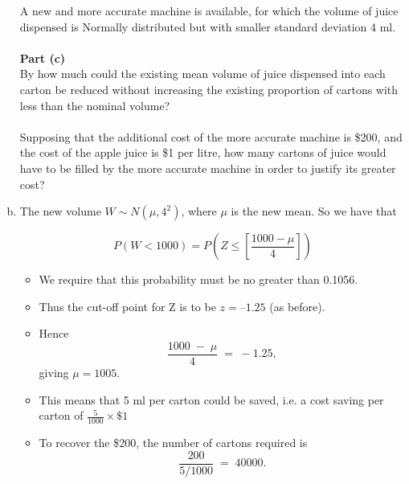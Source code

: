 \documentclass[a4paper,12pt]{article}
\begin{document}
\begin{enumerate}[(a)]
\large
\newpage
\begin{framed} \large
\noindent A new and more accurate machine is available, for which the volume of juice dispensed is Normally distributed but with smaller standard deviation 4 ml.  \\ \\
\noindent \textbf{Part (c)}\\
By how much could the existing mean volume of juice dispensed into each carton be reduced without increasing the existing proportion of cartons with less than the nominal volume?  
\\
\\
Supposing that the additional cost of the more accurate machine is \$200, and the cost of the apple juice is \$1 per litre, how many cartons of juice would have to be filled by the more accurate machine in order to justify its greater cost? 
\end{framed}
\item The new volume $W \sim N(\mu, 4^2)$, where $\mu$ is the new mean. So we have that

\[P(W <  1000) = P \left(Z \leq \left[\frac{1000-\mu}{4} \right] \right) \] 

\begin{itemize}
\item 
We require that this probability must be no greater
than 0.1056.
\item Thus the cut-off point for Z is to be $z = –1.25$ (as before).
\item Hence
\[  \frac{1000 \;-\; \mu}{4} \;=\;-1.25,\]
 giving $\mu = 1005$.
\item This means that 5 ml per carton could be saved, i.e. a cost saving per carton of $ {\displaystyle \frac{5}{1000} \times \$1 }$

\item To recover the \$200, the number of cartons required is 
\[ \frac{200}{5/1000}\;=\; 40000.\]
\end{itemize}

\end{enumerate}
\end{document}
